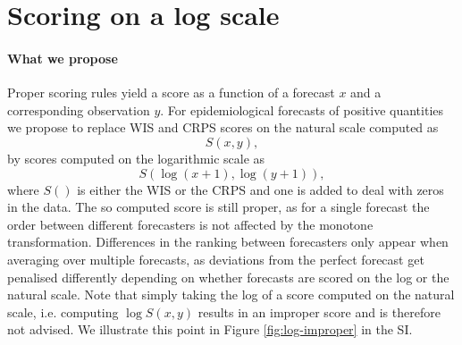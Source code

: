\documentclass{article}
\begin{document}
\section{Scoring on a log scale}

\paragraph{What we propose}
Proper scoring rules yield a score as a function of a forecast $x$ and a corresponding observation $y$. For epidemiological forecasts of positive quantities we propose to replace WIS and CRPS scores on the natural scale computed as 
%
\begin{equation}
S(x, y),     
\end{equation}
%
by scores computed on the logarithmic scale as 
%
\begin{equation}
S(\log{(x + 1)}, \log{(y + 1)}),    
\end{equation}
%
where $S()$ is either the WIS or the CRPS and one is added to deal with zeros in the data. The so computed score is still proper, as for a single forecast the order between different forecasters is not affected by the monotone transformation.
Differences in the ranking between forecasters only appear when averaging over multiple forecasts, as deviations from the perfect forecast get penalised differently depending on whether forecasts are scored on the log or the natural scale. Note that simply taking the log of a score computed on the natural scale, i.e. computing $\log S(x, y)$ results in an improper score and is therefore not advised. We illustrate this point in Figure \ref{fig:log-improper} in the SI. 
\end{document}

